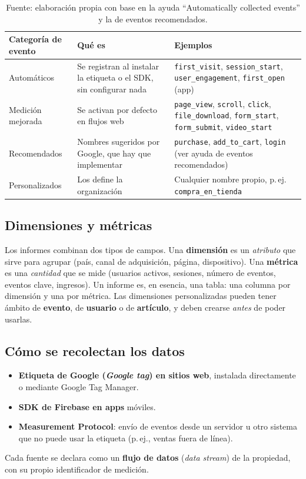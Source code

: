 \documentclass[11pt,letterpaper]{article}
\begin{document}
\begin{table}[h]
\centering
\begin{tabular}{@{}p{3.6cm}p{6.2cm}p{4.6cm}@{}}
\toprule
\textbf{Categoría de evento} & \textbf{Qué es} & \textbf{Ejemplos} \\
\midrule
Automáticos & Se registran al instalar la etiqueta o el SDK, sin configurar nada & \texttt{first\_visit}, \texttt{session\_start}, \texttt{user\_engagement}, \texttt{first\_open} (app) \\
Medición mejorada & Se activan por defecto en flujos web & \texttt{page\_view}, \texttt{scroll}, \texttt{click}, \texttt{file\_download}, \texttt{form\_start}, \texttt{form\_submit}, \texttt{video\_start} \\
Recomendados & Nombres sugeridos por Google, que hay que implementar & \texttt{purchase}, \texttt{add\_to\_cart}, \texttt{login} (ver ayuda de eventos recomendados) \\
Personalizados & Los define la organización & Cualquier nombre propio, p.\,ej. \texttt{compra\_en\_tienda} \\
\bottomrule
\end{tabular}
\caption*{Fuente: elaboración propia con base en la ayuda \enquote{Automatically collected events} y la de eventos recomendados.}
\end{table}

\subsection{Dimensiones y métricas}

Los informes combinan dos tipos de campos. Una \textbf{dimensión} es un \emph{atributo} que sirve para agrupar (país, canal de adquisición, página, dispositivo).
Una \textbf{métrica} es una \emph{cantidad} que se mide (usuarios activos, sesiones, número de eventos, eventos clave, ingresos). Un informe es, en esencia, una tabla:
una columna por dimensión y una por métrica. Las dimensiones personalizadas pueden tener ámbito de \textbf{evento}, de \textbf{usuario} o de \textbf{artículo}, y deben crearse
\emph{antes} de poder usarlas.

\subsection{Cómo se recolectan los datos}

\begin{itemize}[nosep]
  \item \textbf{Etiqueta de Google (\emph{Google tag}) en sitios web}, instalada directamente o mediante Google Tag Manager.
  \item \textbf{SDK de Firebase en apps} móviles.
  \item \textbf{Measurement Protocol}: envío de eventos desde un servidor u otro sistema que no puede usar la etiqueta (p.\,ej., ventas fuera de línea).
\end{itemize}
Cada fuente se declara como un \textbf{flujo de datos} (\emph{data stream}) de la propiedad, con su propio identificador de medición.
\end{document}

